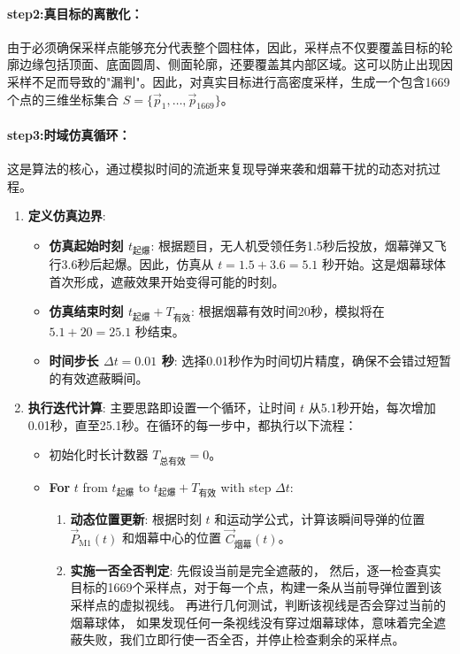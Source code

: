\documentclass[5pt, withoutpreface,bwprint]{cumcmthesis} %
\begin{document}
\paragraph{step2:真目标的离散化：}
由于必须确保采样点能够充分代表整个圆柱体，因此，采样点不仅要覆盖目标的轮廓边缘包括顶面、底面圆周、侧面轮廓，还要覆盖其内部区域。这可以防止出现因采样不足而导致的"漏判"。因此，对真实目标进行高密度采样，生成一个包含1669个点的三维坐标集合 $S = \{\vec{p}_1, \dots, \vec{p}_{1669}\}$。
\paragraph{step3:时域仿真循环：}
这是算法的核心，通过模拟时间的流逝来复现导弹来袭和烟幕干扰的动态对抗过程。
\begin{enumerate}
    \item \textbf{定义仿真边界}:
    \begin{itemize}
        \item \textbf{仿真起始时刻 $t_{\text{起爆}}$}: 根据题目，无人机受领任务1.5秒后投放，烟幕弹又飞行3.6秒后起爆。因此，仿真从 $t = 1.5 + 3.6 = 5.1$ 秒开始。这是烟幕球体首次形成，遮蔽效果开始变得可能的时刻。
        \item \textbf{仿真结束时刻 $t_{\text{起爆}} + T_{\text{有效}}$}: 根据烟幕有效时间20秒，模拟将在 $5.1 + 20 = 25.1$ 秒结束。
        \item \textbf{时间步长 $\Delta t = 0.01$ 秒}: 选择0.01秒作为时间切片精度，确保不会错过短暂的有效遮蔽瞬间。
    \end{itemize}
    
    \item \textbf{执行迭代计算}:
    主要思路即设置一个循环，让时间 $t$ 从5.1秒开始，每次增加0.01秒，直至25.1秒。在循环的每一步中，都执行以下流程：
    \begin{itemize}
        \item 初始化时长计数器 $T_{\text{总有效}} = 0$。
        \item \textbf{For} $t$ from $t_{\text{起爆}}$ to $t_{\text{起爆}} + T_{\text{有效}}$ with step $\Delta t$:
        \begin{enumerate}
            \item \textbf{动态位置更新}: 根据时刻 $t$ 和运动学公式，计算该瞬间导弹的位置 $\vec{P}_{\text{M1}}(t)$ 和烟幕中心的位置 $\vec{C}_{\text{烟幕}}(t)$。
            
            \item \textbf{实施一否全否判定}: 
            先假设当前是完全遮蔽的，
                 然后，逐一检查真实目标的1669个采样点，对于每一个点，构建一条从当前导弹位置到该采样点的虚拟视线。
                再进行几何测试，判断该视线是否会穿过当前的烟幕球体，
                如果发现任何一条视线没有穿过烟幕球体，意味着完全遮蔽失败，我们立即行使一否全否，并停止检查剩余的采样点。
          

\end{enumerate}
\end{itemize}
\end{enumerate}
\end{document}
